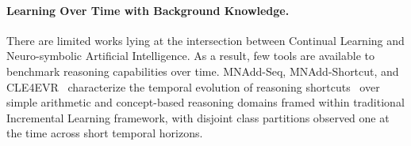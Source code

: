 \paragraph{Learning Over Time with Background Knowledge.} There are limited works lying at the intersection between Continual Learning and Neuro-symbolic Artificial Intelligence. As a result, few tools are available to benchmark reasoning capabilities over time.
MNAdd-Seq, MNAdd-Shortcut, and CLE4EVR~\cite{marconato2023neuro} characterize the temporal evolution of reasoning shortcuts~\cite{marconato2023not} over simple arithmetic and concept-based reasoning domains framed within traditional Incremental Learning framework, with disjoint class partitions observed one at the time across short temporal horizons.
%

